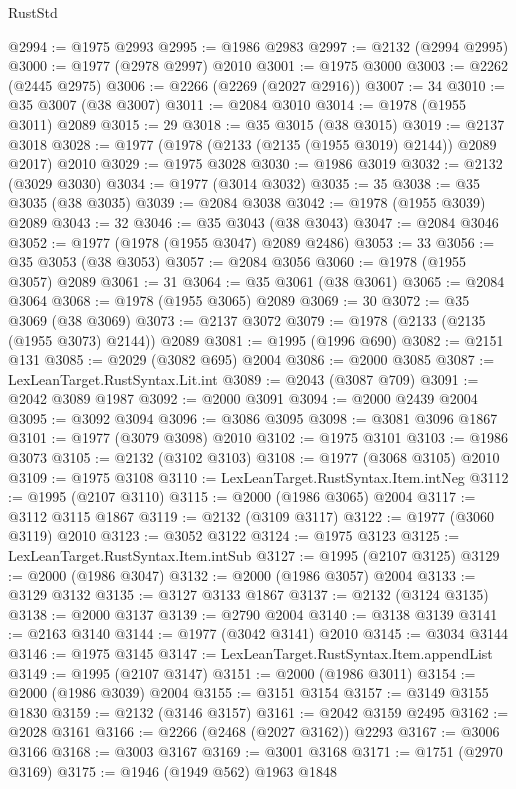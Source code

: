 \begin{lexlean}{RustStd}
\begin{coremodule}
@2994 := @1975 @2993
@2995 := @1986 @2983
@2997 := @2132 (@2994 @2995)
@3000 := @1977 (@2978 @2997) @2010
@3001 := @1975 @3000
@3003 := @2262 (@2445 @2975)
@3006 := @2266 (@2269 (@2027 @2916))
@3007 := 34
@3010 := @35 @3007 (@38 @3007)
@3011 := @2084 @3010
@3014 := @1978 (@1955 @3011) @2089
@3015 := 29
@3018 := @35 @3015 (@38 @3015)
@3019 := @2137 @3018
@3028 := @1977 (@1978 (@2133 (@2135 (@1955 @3019) @2144)) @2089 @2017) @2010
@3029 := @1975 @3028
@3030 := @1986 @3019
@3032 := @2132 (@3029 @3030)
@3034 := @1977 (@3014 @3032)
@3035 := 35
@3038 := @35 @3035 (@38 @3035)
@3039 := @2084 @3038
@3042 := @1978 (@1955 @3039) @2089
@3043 := 32
@3046 := @35 @3043 (@38 @3043)
@3047 := @2084 @3046
@3052 := @1977 (@1978 (@1955 @3047) @2089 @2486)
@3053 := 33
@3056 := @35 @3053 (@38 @3053)
@3057 := @2084 @3056
@3060 := @1978 (@1955 @3057) @2089
@3061 := 31
@3064 := @35 @3061 (@38 @3061)
@3065 := @2084 @3064
@3068 := @1978 (@1955 @3065) @2089
@3069 := 30
@3072 := @35 @3069 (@38 @3069)
@3073 := @2137 @3072
@3079 := @1978 (@2133 (@2135 (@1955 @3073) @2144)) @2089
@3081 := @1995 (@1996 @690)
@3082 := @2151 @131
@3085 := @2029 (@3082 @695) @2004
@3086 := @2000 @3085
@3087 := LexLeanTarget.RustSyntax.Lit.int
@3089 := @2043 (@3087 @709)
@3091 := @2042 @3089 @1987
@3092 := @2000 @3091
@3094 := @2000 @2439 @2004
@3095 := @3092 @3094
@3096 := @3086 @3095
@3098 := @3081 @3096 @1867
@3101 := @1977 (@3079 @3098) @2010
@3102 := @1975 @3101
@3103 := @1986 @3073
@3105 := @2132 (@3102 @3103)
@3108 := @1977 (@3068 @3105) @2010
@3109 := @1975 @3108
@3110 := LexLeanTarget.RustSyntax.Item.intNeg
@3112 := @1995 (@2107 @3110)
@3115 := @2000 (@1986 @3065) @2004
@3117 := @3112 @3115 @1867
@3119 := @2132 (@3109 @3117)
@3122 := @1977 (@3060 @3119) @2010
@3123 := @3052 @3122
@3124 := @1975 @3123
@3125 := LexLeanTarget.RustSyntax.Item.intSub
@3127 := @1995 (@2107 @3125)
@3129 := @2000 (@1986 @3047)
@3132 := @2000 (@1986 @3057) @2004
@3133 := @3129 @3132
@3135 := @3127 @3133 @1867
@3137 := @2132 (@3124 @3135)
@3138 := @2000 @3137
@3139 := @2790 @2004
@3140 := @3138 @3139
@3141 := @2163 @3140
@3144 := @1977 (@3042 @3141) @2010
@3145 := @3034 @3144
@3146 := @1975 @3145
@3147 := LexLeanTarget.RustSyntax.Item.appendList
@3149 := @1995 (@2107 @3147)
@3151 := @2000 (@1986 @3011)
@3154 := @2000 (@1986 @3039) @2004
@3155 := @3151 @3154
@3157 := @3149 @3155 @1830
@3159 := @2132 (@3146 @3157)
@3161 := @2042 @3159 @2495
@3162 := @2028 @3161
@3166 := @2266 (@2468 (@2027 @3162)) @2293
@3167 := @3006 @3166
@3168 := @3003 @3167
@3169 := @3001 @3168
@3171 := @1751 (@2970 @3169)
@3175 := @1946 (@1949 @562) @1963 @1848

\end{coremodule}
\end{lexlean}
